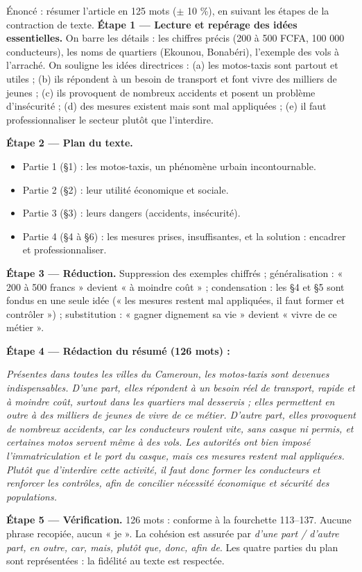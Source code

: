 \documentclass[11pt]{article}
\begin{document}
\begin{exoresolu}
Énoncé : résumer l'article en 125 mots ($\pm$ 10 \%), en suivant les étapes de la contraction de texte.
\tcblower
\textbf{Étape 1 — Lecture et repérage des idées essentielles.} On barre les détails : les chiffres précis (200 à 500 FCFA, 100 000 conducteurs), les noms de quartiers (Ekounou, Bonabéri), l'exemple des vols à l'arraché. On souligne les idées directrices : (a) les motos-taxis sont partout et utiles ; (b) ils répondent à un besoin de transport et font vivre des milliers de jeunes ; (c) ils provoquent de nombreux accidents et posent un problème d'insécurité ; (d) des mesures existent mais sont mal appliquées ; (e) il faut professionnaliser le secteur plutôt que l'interdire.

\textbf{Étape 2 — Plan du texte.}
\begin{itemize}
\item Partie 1 (§1) : les motos-taxis, un phénomène urbain incontournable.
\item Partie 2 (§2) : leur utilité économique et sociale.
\item Partie 3 (§3) : leurs dangers (accidents, insécurité).
\item Partie 4 (§4 à §6) : les mesures prises, insuffisantes, et la solution : encadrer et professionnaliser.
\end{itemize}

\textbf{Étape 3 — Réduction.} Suppression des exemples chiffrés ; généralisation : « 200 à 500 francs » devient « à moindre coût » ; condensation : les §4 et §5 sont fondus en une seule idée (« les mesures restent mal appliquées, il faut former et contrôler ») ; substitution : « gagner dignement sa vie » devient « vivre de ce métier ».

\textbf{Étape 4 — Rédaction du résumé (126 mots) :}

\emph{Présentes dans toutes les villes du Cameroun, les motos-taxis sont devenues indispensables. D'une part, elles répondent à un besoin réel de transport, rapide et à moindre coût, surtout dans les quartiers mal desservis ; elles permettent en outre à des milliers de jeunes de vivre de ce métier. D'autre part, elles provoquent de nombreux accidents, car les conducteurs roulent vite, sans casque ni permis, et certaines motos servent même à des vols. Les autorités ont bien imposé l'immatriculation et le port du casque, mais ces mesures restent mal appliquées. Plutôt que d'interdire cette activité, il faut donc former les conducteurs et renforcer les contrôles, afin de concilier nécessité économique et sécurité des populations.}

\textbf{Étape 5 — Vérification.} 126 mots : conforme à la fourchette 113--137. Aucune phrase recopiée, aucun « je ». La cohésion est assurée par \emph{d'une part / d'autre part, en outre, car, mais, plutôt que, donc, afin de}. Les quatre parties du plan sont représentées : la fidélité au texte est respectée.
\end{exoresolu}
\end{document}

